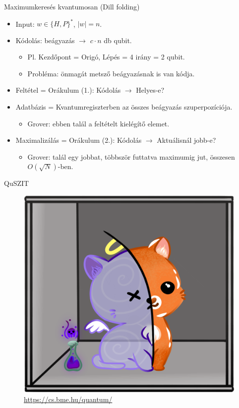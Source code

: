 \documentclass[aspectratio=169]{beamer}
\begin{document}
\begin{frame}{Maximumkeresés kvantumosan (Dill folding)}
\begin{itemize}
    \item Input: $w \in{} \{H,P\}^*$, $|w| = n$.
    \item Kódolás: beágyazás $\rightarrow$ $c\cdot{}n$ db qubit.
    \begin{itemize}
        \item Pl. Kezdőpont = Origó, Lépés = 4 irány = 2 qubit.
        \item Probléma: önmagát metsző beágyazásnak is van kódja.
    \end{itemize}
    \item Feltétel = Orákulum (1.): Kódolás $\rightarrow$ Helyes-e?
    \item Adatbázis = Kvantumregiszterben az összes beágyazás szuperpozíciója.
    \begin{itemize}
        \item Grover: ebben talál a feltételt kielégítő elemet.
    \end{itemize}
    \item Maximalizálás = Orákulum (2.): Kódolás $\rightarrow$ Aktuálisnál jobb-e?
    \begin{itemize}
        \item Grover: talál egy jobbat, többször futtatva maximumig jut, összesen $O(\sqrt{N})$-ben.
    \end{itemize}
\end{itemize}
\end{frame}

\begin{frame}{QuSZIT}
\begin{figure}
    \centering
    \includegraphics[width=0.4\linewidth]{./dipterv1_figures/schrodingers_purple.png}
    \vspace{0.3cm}
    \caption{\huge{\href{https://cs.bme.hu/quantum/}{https://cs.bme.hu/quantum/}}}
\end{figure}
\end{frame}
\end{document}

